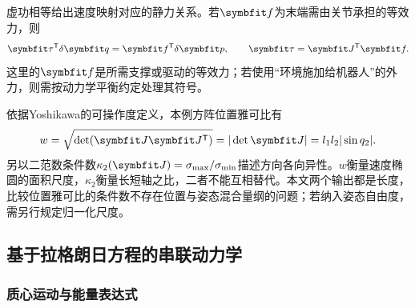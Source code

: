 虚功相等给出速度映射对应的静力关系。若$\vect f$为末端需由关节承担的等效力，则
\begin{equation}
\vect\tau^\T\delta\vect q=\vect f^\T\delta\vect p,
\qquad \vect\tau=\vect J^\T\vect f.
\label{eq:virtual_serial}
\end{equation}
这里的$\vect f$是所需支撑或驱动的等效力；若使用“环境施加给机器人”的外力，则需按动力学平衡约定处理其符号。

依据Yoshikawa的可操作度定义\cite{yoshikawa1985}，本例方阵位置雅可比有
\begin{equation}
w=\sqrt{\det(\vect J\vect J^\T)}=|\det\vect J|=l_1l_2|\sin q_2|.
\end{equation}
另以二范数条件数$\kappa_2(\vect J)=\sigma_{\max}/\sigma_{\min}$描述方向各向异性。$w$衡量速度椭圆的面积尺度，$\kappa_2$衡量长短轴之比，二者不能互相替代。本文两个输出都是长度，比较位置雅可比的条件数不存在位置与姿态混合量纲的问题；若纳入姿态自由度，需另行规定归一化尺度。


\subsection{基于拉格朗日方程的串联动力学}
\label{sec:lagrange}

\subsubsection{质心运动与能量表达式}

